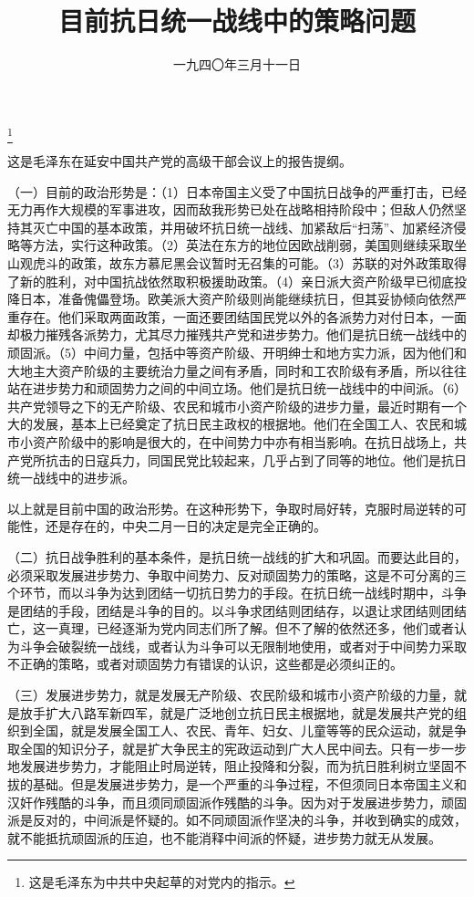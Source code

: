 
\title{目前抗日统一战线中的策略问题}
\date{一九四〇年三月十一日}
\thanks{这是毛泽东为中共中央起草的对党内的指示。}
\maketitle


这是毛泽东在延安中国共产党的高级干部会议上的报告提纲。

（一）目前的政治形势是：（1）日本帝国主义受了中国抗日战争的严重打击，已经无力再作大规模的军事进攻，因而敌我形势已处在战略相持阶段中；但敌人仍然坚持其灭亡中国的基本政策，并用破坏抗日统一战线、加紧敌后“扫荡”、加紧经济侵略等方法，实行这种政策。（2）英法在东方的地位因欧战削弱，美国则继续采取坐山观虎斗的政策，故东方慕尼黑会议暂时无召集的可能。（3）苏联的对外政策取得了新的胜利，对中国抗战依然取积极援助政策。（4）亲日派大资产阶级早已彻底投降日本，准备傀儡登场。欧美派大资产阶级则尚能继续抗日，但其妥协倾向依然严重存在。他们采取两面政策，一面还要团结国民党以外的各派势力对付日本，一面却极力摧残各派势力，尤其尽力摧残共产党和进步势力。他们是抗日统一战线中的顽固派。（5）中间力量，包括中等资产阶级、开明绅士和地方实力派，因为他们和大地主大资产阶级的主要统治力量之间有矛盾，同时和工农阶级有矛盾，所以往往站在进步势力和顽固势力之间的中间立场。他们是抗日统一战线中的中间派。（6）共产党领导之下的无产阶级、农民和城市小资产阶级的进步力量，最近时期有一个大的发展，基本上已经奠定了抗日民主政权的根据地。他们在全国工人、农民和城市小资产阶级中的影响是很大的，在中间势力中亦有相当影响。在抗日战场上，共产党所抗击的日寇兵力，同国民党比较起来，几乎占到了同等的地位。他们是抗日统一战线中的进步派。

以上就是目前中国的政治形势。在这种形势下，争取时局好转，克服时局逆转的可能性，还是存在的，中央二月一日的决定是完全正确的。

（二）抗日战争胜利的基本条件，是抗日统一战线的扩大和巩固。而要达此目的，必须采取发展进步势力、争取中间势力、反对顽固势力的策略，这是不可分离的三个环节，而以斗争为达到团结一切抗日势力的手段。在抗日统一战线时期中，斗争是团结的手段，团结是斗争的目的。以斗争求团结则团结存，以退让求团结则团结亡，这一真理，已经逐渐为党内同志们所了解。但不了解的依然还多，他们或者认为斗争会破裂统一战线，或者认为斗争可以无限制地使用，或者对于中间势力采取不正确的策略，或者对顽固势力有错误的认识，这些都是必须纠正的。

（三）发展进步势力，就是发展无产阶级、农民阶级和城市小资产阶级的力量，就是放手扩大八路军新四军，就是广泛地创立抗日民主根据地，就是发展共产党的组织到全国，就是发展全国工人、农民、青年、妇女、儿童等等的民众运动，就是争取全国的知识分子，就是扩大争民主的宪政运动到广大人民中间去。只有一步一步地发展进步势力，才能阻止时局逆转，阻止投降和分裂，而为抗日胜利树立坚固不拔的基础。但是发展进步势力，是一个严重的斗争过程，不但须同日本帝国主义和汉奸作残酷的斗争，而且须同顽固派作残酷的斗争。因为对于发展进步势力，顽固派是反对的，中间派是怀疑的。如不同顽固派作坚决的斗争，并收到确实的成效，就不能抵抗顽固派的压迫，也不能消释中间派的怀疑，进步势力就无从发展。

